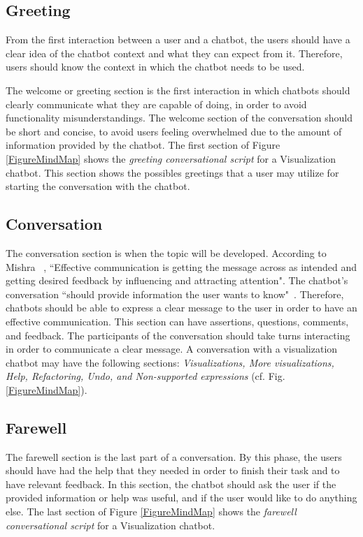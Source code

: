 \documentclass[a4paper,10pt]{article}
\begin{document}
\subsection{Greeting}
From the first interaction between a user and a chatbot, the users should have a clear idea of the chatbot context and what they can expect from it. Therefore, users should know the context in which the chatbot needs to be used.

The welcome or greeting section is the first interaction in which chatbots should clearly communicate what they are capable of doing, in order to avoid functionality misunderstandings. 
The welcome section of the conversation should be short and concise, to avoid users feeling overwhelmed due to the amount of information provided by the chatbot. The first section of Figure \ref{FigureMindMap} shows the \textit{greeting conversational script} for a Visualization chatbot. This section shows the possibles greetings that a user may utilize for starting the conversation with the chatbot.  

\subsection{Conversation}
The conversation section is when the topic will be developed. According to Mishra ~\cite{effectivCommunication}, ``Effective communication is getting the message across as intended and getting desired feedback by influencing and attracting attention". The chatbot's conversation ``should provide information the user wants to know"~\cite{HowChatbotsCanHelpUsers}. Therefore, chatbots should be able to express a clear message to the user in order to have an effective communication. This section can have assertions, questions, comments, and feedback. The participants of the conversation should take turns interacting in order to communicate a clear message. A conversation with a visualization chatbot may have the following sections: \textit{Visualizations, More visualizations, Help, Refactoring, Undo, and Non-supported expressions} (cf. Fig. \ref{FigureMindMap}).

\subsection{Farewell}
The farewell section is the last part of a conversation. By this phase, the users should have had the help that they needed in order to finish their task and to have relevant feedback. In this section, the chatbot should ask the user if the provided information or help was useful, and if the user would like to do anything else. The last section of Figure \ref{FigureMindMap} shows the \textit{farewell conversational script} for a Visualization chatbot. 
\end{document}
